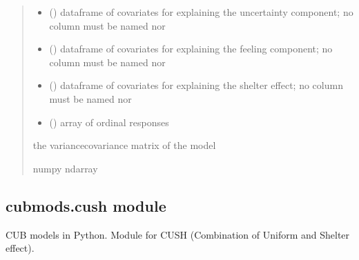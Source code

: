 \documentclass[letterpaper,10pt,english]{sphinxmanual}
\begin{document}
\begin{fulllineitems}
\begin{quote}
\begin{description}
\begin{itemize}
\item {} 
\sphinxAtStartPar
{} () \textendash{} dataframe of covariates for explaining the uncertainty component;
no column must be named  nor 

\item {} 
\sphinxAtStartPar
{} () \textendash{} dataframe of covariates for explaining the feeling component;
no column must be named  nor 

\item {} 
\sphinxAtStartPar
{} () \textendash{} dataframe of covariates for explaining the shelter effect;
no column must be named  nor 

\item {} 
\sphinxAtStartPar
{} () \textendash{} array of ordinal responses

\end{itemize}

\sphinxAtStartPar
the variance\sphinxhyphen{}covariance matrix of the model

\sphinxAtStartPar
numpy ndarray

\end{description}\end{quote}

\end{fulllineitems}



\subsection{cubmods.cush module}
\label{\detokenize{cubmods:module-cubmods.cush}}\label{\detokenize{cubmods:cubmods-cush-module}}
\sphinxAtStartPar
CUB models in Python.
Module for CUSH (Combination of Uniform
and Shelter effect).
\end{document}
